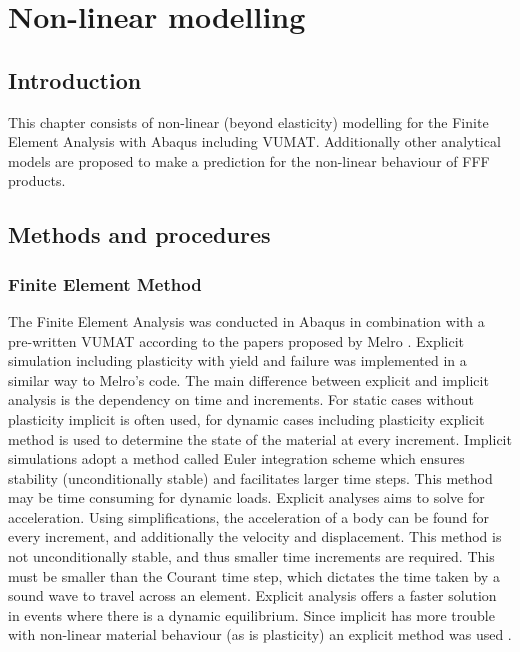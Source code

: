 \chapter{Non-linear modelling}
\label{chp:5}

\section{Introduction}
This chapter consists of  non-linear (beyond elasticity) modelling for the Finite Element Analysis with Abaqus including VUMAT. Additionally other analytical models are proposed to make a prediction for the non-linear behaviour of FFF products. 

\section{Methods and procedures}
\subsection{Finite Element Method}
The Finite Element Analysis was conducted in Abaqus in combination with a pre-written VUMAT according to the papers proposed by Melro \cite{Melro2012InfluenceMaterials}\cite{Melro2013}\cite{Melro2013MicromechanicalModelling}. 
Explicit simulation including plasticity with yield and failure was implemented in a similar way to Melro's code. The main difference between explicit and implicit analysis is the dependency on time and increments. For static cases without plasticity implicit is often used, for dynamic cases including plasticity explicit method is used to determine the state of the material at every increment. Implicit simulations adopt a method called Euler integration scheme which ensures stability (unconditionally stable) and facilitates larger time steps. This method may be time consuming for dynamic loads.  Explicit analyses aims to solve for acceleration. Using simplifications, the acceleration of a body can be found for every increment, and additionally the velocity and displacement. This method is not unconditionally stable, and thus smaller time increments are required. This must be smaller than the Courant time step, which dictates the time taken by a sound wave to travel across an element. Explicit analysis offers a faster solution in events where there is a dynamic equilibrium. Since implicit has more trouble with non-linear material behaviour (as is plasticity) an explicit method was used \cite{ImplicitMethod}.

